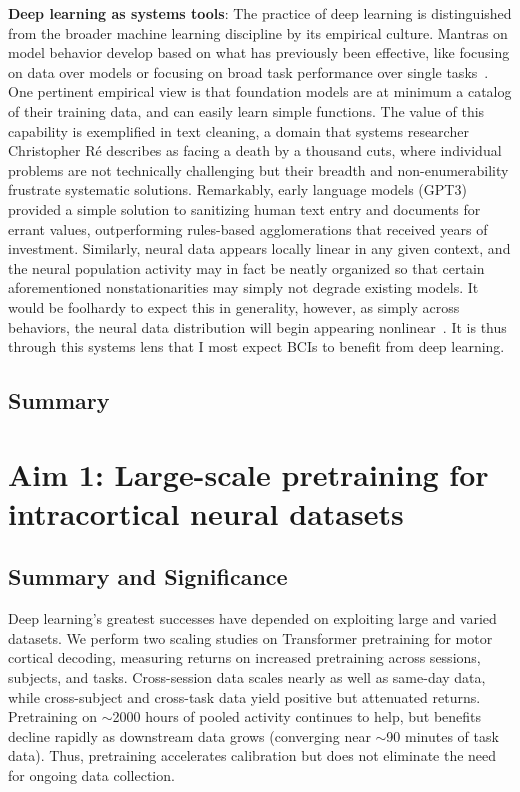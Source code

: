 \documentclass[12pt,oneside]{report}
\begin{document}
\textbf{Deep learning as systems tools}: The practice of deep learning is distinguished from the broader machine learning discipline by its empirical culture. Mantras on model behavior develop based on what has previously been effective, like focusing on data over models or focusing on broad task performance over single tasks~\citep{abnar2021exploringlimitslargescale}. One pertinent empirical view is that foundation models are at minimum a catalog of their training data, and can easily learn simple functions. The value of this capability is exemplified in text cleaning, a domain that systems researcher Christopher Ré describes as facing a death by a thousand cuts, where individual problems are not technically challenging but their breadth and non-enumerability frustrate systematic solutions. Remarkably, early language models (GPT3) provided a simple solution to sanitizing human text entry and documents for errant values, outperforming rules-based agglomerations that received years of investment. Similarly, neural data appears locally linear in any given context, and the neural population activity may in fact be neatly organized so that certain aforementioned nonstationarities may simply not degrade existing models. It would be foolhardy to expect this in generality, however, as simply across behaviors, the neural data distribution will begin appearing nonlinear~\citep{fortunato2024nonlinear}. It is thus through this systems lens that I most expect BCIs to benefit from deep learning.

\section{Summary}



\chapter{Aim 1: Large-scale pretraining for intracortical neural datasets}

\section{Summary and Significance}
Deep learning’s greatest successes have depended on exploiting large and varied datasets. We perform two scaling studies on Transformer pretraining for motor cortical decoding, measuring returns on increased pretraining across sessions, subjects, and tasks. Cross-session data scales nearly as well as same-day data, while cross-subject and cross-task data yield positive but attenuated returns. Pretraining on $\sim$2000 hours of pooled activity continues to help, but benefits decline rapidly as downstream data grows (converging near $\sim$90 minutes of task data). Thus, pretraining accelerates calibration but does not eliminate the need for ongoing data collection.
\end{document}
